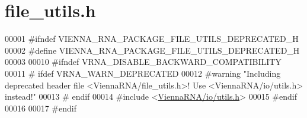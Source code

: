 \hypertarget{file__utils_8h_source}{}\section{file\+\_\+utils.\+h}
\label{file__utils_8h_source}

\begin{DoxyCode}
00001 \textcolor{preprocessor}{#ifndef VIENNA\_RNA\_PACKAGE\_FILE\_UTILS\_DEPRECATED\_H}
00002 \textcolor{preprocessor}{#define VIENNA\_RNA\_PACKAGE\_FILE\_UTILS\_DEPRECATED\_H}
00003 
00010 \textcolor{preprocessor}{#ifndef VRNA\_DISABLE\_BACKWARD\_COMPATIBILITY}
00011 \textcolor{preprocessor}{# ifdef VRNA\_WARN\_DEPRECATED}
00012 \textcolor{preprocessor}{#warning "Including deprecated header file <ViennaRNA/file\_utils.h>! Use <ViennaRNA/io/utils.h> instead!"}
00013 \textcolor{preprocessor}{# endif}
00014 \textcolor{preprocessor}{#include <\hyperlink{io_2utils_8h}{ViennaRNA/io/utils.h}>}
00015 \textcolor{preprocessor}{#endif}
00016 
00017 \textcolor{preprocessor}{#endif}
\end{DoxyCode}

